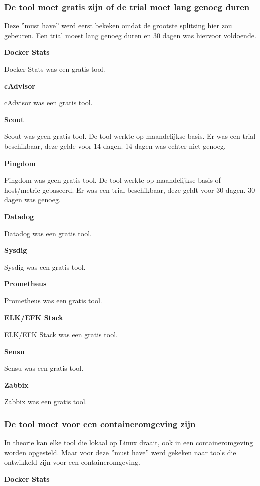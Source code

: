 \clearpage

\subsubsection{De tool moet gratis zijn of de trial moet lang genoeg duren}

Deze ''must have'' werd eerst bekeken omdat de grootste splitsing hier zou gebeuren. Een trial moest lang genoeg duren en 30 dagen was hiervoor voldoende.

\textbf{Docker Stats}

Docker Stats was een gratis tool.

\textbf{cAdvisor}

cAdvisor was een gratis tool.

\textbf{Scout}

Scout was geen gratis tool. De tool werkte op maandelijkse basis. Er was een trial beschikbaar, deze gelde voor 14 dagen. 14 dagen was echter niet genoeg.

\textbf{Pingdom}

Pingdom was geen gratis tool. De tool werkte op maandelijkse basis of host/metric gebaseerd. Er was een trial beschikbaar, deze geldt voor 30 dagen. 30 dagen was genoeg.

\textbf{Datadog}

Datadog was een gratis tool.

\textbf{Sysdig}

Sysdig was een gratis tool.

\textbf{Prometheus}

Prometheus was een gratis tool.

\textbf{ELK/EFK Stack}

ELK/EFK Stack was een gratis tool.

\textbf{Sensu}

Sensu was een gratis tool.

\textbf{Zabbix}

Zabbix was een gratis tool.

\subsubsection{De tool moet voor een containeromgeving zijn}

In theorie kan elke tool die lokaal op Linux draait, ook in een containeromgeving worden opgesteld. Maar voor deze ''must have'' werd gekeken naar tools die ontwikkeld zijn voor een containeromgeving.

\textbf{Docker Stats} 

